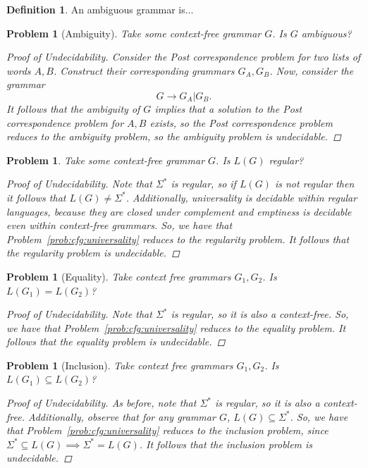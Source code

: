 \documentclass[psamsfonts]{amsart}
\newtheorem{prob}[thm]{Problem}
\theoremstyle{definition}
\newtheorem{defn}[thm]{Definition}
\theoremstyle{remark}
\numberwithin{equation}{section}
\begin{document}
\begin{defn}
An ambiguous grammar is...
\end{defn}

\begin{prob}[Ambiguity]
  Take some context-free grammar $G$. Is $G$ ambiguous?
  \begin{proof}[Proof of Undecidability]
    Consider the Post correspondence problem for two lists of words
    $A,B$. Construct their corresponding grammars $G_A,G_B$. Now, consider the
    grammar
    \[
      G \rightarrow G_A \vert G_B.
    \]
    It follows that the ambiguity of $G$ implies that a solution to the Post
    correspondence problem for $A,B$ exists, so the Post correspondence problem
    reduces to the ambiguity problem, so the ambiguity problem is undecidable.
  \end{proof}
\end{prob}
\cite{greibach66:_unsol_recog_linear_contex_free_languag}
\cite{Hopcroft1969}
\begin{prob}
  Take some context-free grammar $G$. Is $L(G)$ regular?
  \begin{proof}[Proof of Undecidability]
    Note that $\Sigma^*$ is regular, so if $L(G)$ is not regular then it follows
    that $L(G)\neq \Sigma^*$. Additionally, universality is decidable within
    regular languages, because they are closed under complement and emptiness is
    decidable even within context-free grammars. So, we have that
    Problem~\ref{prob:cfg:universality} reduces to the regularity problem. It
    follows that the regularity problem is undecidable.
  \end{proof}
\end{prob}
\begin{prob}[Equality]
  Take context free grammars $G_1,G_2$. Is $L(G_1)=L(G_2)$?
  \begin{proof}[Proof of Undecidability]
    Note that $\Sigma^*$ is regular, so it is also a context-free. So,
    we have that Problem~\ref{prob:cfg:universality} reduces to the equality
    problem. It follows that the equality problem is undecidable.
  \end{proof}
\end{prob}
\begin{prob}[Inclusion]
  Take context free grammars $G_1,G_2$. Is $L(G_1)\subseteq L(G_2)$?
  \begin{proof}[Proof of Undecidability]
    As before, note that $\Sigma^*$ is regular, so it is also a
    context-free. Additionally, observe that for any grammar $G$, $L(G)\subseteq
    \Sigma^*$. So,
    we have that Problem~\ref{prob:cfg:universality} reduces to the inclusion
    problem, since $\Sigma^* \subseteq L(G) \implies \Sigma^* = L(G)$. It follows that the inclusion problem is undecidable.
  \end{proof}
\end{prob}
\end{document}

